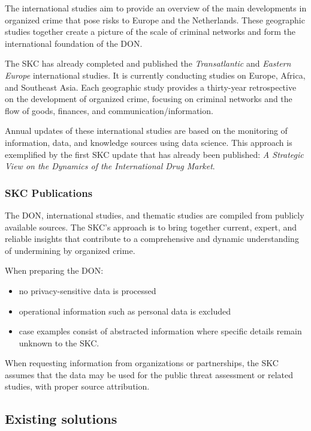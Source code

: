 The international studies aim to provide an overview of the main developments in organized crime that pose risks to Europe and the Netherlands. These geographic studies together create a picture of the scale of criminal networks and form the international foundation of the DON.

The SKC has already completed and published the \emph{Transatlantic} and \emph{Eastern Europe} international studies. It is currently conducting studies on Europe, Africa, and Southeast Asia. Each geographic study provides a thirty-year retrospective on the development of organized crime, focusing on criminal networks and the flow of goods, finances, and communication/information.

Annual updates of these international studies are based on the monitoring of information, data, and knowledge sources using data science. This approach is exemplified by the first SKC update that has already been published: \emph{A Strategic View on the Dynamics of the International Drug Market}.

\subsubsection{SKC Publications}
The DON, international studies, and thematic studies are compiled from publicly available sources. The SKC’s approach is to bring together current, expert, and reliable insights that contribute to a comprehensive and dynamic understanding of undermining by organized crime.

When preparing the DON:
\begin{itemize}
	\item no privacy-sensitive data is processed
	\item operational information such as personal data is excluded
	\item case examples consist of abstracted information where specific details remain unknown to the SKC.
\end{itemize}

When requesting information from organizations or partnerships, the SKC assumes that the data may be used for the public threat assessment or related studies, with proper source attribution.

\subsection{Existing solutions}
\label{subsec:API}

